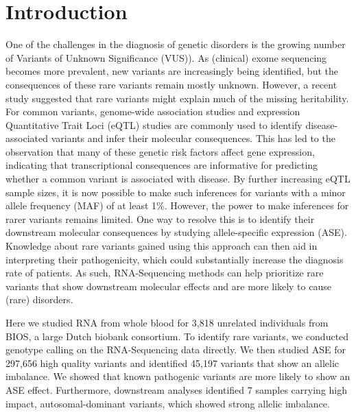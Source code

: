 \section{Introduction}
One of the challenges in the diagnosis of genetic disorders is the growing number of Variants of Unknown Significance (VUS)\cite{hoffman-andrewsKnownUnknownChallenges2018,direstaNextgenerationSequencingApproach2018}). As (clinical) exome sequencing becomes more prevalent, new variants are increasingly being identified, but the consequences of these rare variants remain mostly unknown. However, a recent study suggested that rare variants might explain much of the missing heritability\cite{wainschteinRecoveryTraitHeritability2019}. For common variants, genome-wide association studies and expression Quantitative Trait Loci (eQTL) studies\cite{zhernakovaIdentificationContextdependentExpression2017b,aguetGeneticEffectsGene2017,vosaUnravelingPolygenicArchitecture2018a} are commonly used to identify disease-associated variants and infer their molecular consequences. This has led to the observation that many of these genetic risk factors affect gene expression, indicating that transcriptional consequences are informative for predicting whether a common variant is associated with disease. By further increasing eQTL sample sizes, it is now possible to make such inferences for variants with a minor allele frequency (MAF) of at least 1\%\cite{vosaUnravelingPolygenicArchitecture2018a}. However, the power to make inferences for rarer variants remains limited. One way to resolve this is to identify their downstream molecular consequences by studying allele-specific expression (ASE)\cite{bombaImpactRareLowfrequency2017}. Knowledge about rare variants gained using this approach can then aid in interpreting their pathogenicity, which could substantially increase the diagnosis rate of patients\cite{macarthurGuidelinesInvestigatingCausality2014,kremerGeneticDiagnosisMendelian2017}. As such, RNA-Sequencing methods can help prioritize rare variants that show downstream molecular effects and are more likely to cause (rare) disorders.

Here we studied RNA from whole blood for 3,818 unrelated individuals from BIOS, a large Dutch biobank consortium. To identify rare variants, we conducted genotype calling on the RNA-Sequencing data directly. We then studied ASE for 297,656 high quality variants and identified 45,197 variants that show an allelic imbalance. We showed that known pathogenic variants are more likely to show an ASE effect. Furthermore, downstream analyses identified 7 samples carrying high impact, autosomal-dominant variants, which showed strong allelic imbalance.


